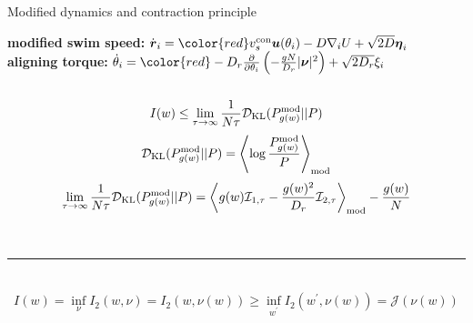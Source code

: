 \documentclass{beamer}
\begin{document}
\begin{frame}{Modified dynamics and contraction principle}

{\bf modified swim speed:} $\dot{\boldsymbol{r}}_i = {\color{red}v^{\rm con}_s} \boldsymbol{u}(\theta_i) - D \nabla_i U + \sqrt{2 D} \boldsymbol{\eta}_i$\\
{\bf aligning torque:} $\dot{\theta}_i = {\color{red}-D_r \frac{\partial}{\partial \theta_i} \left(- \frac{g N}{D_r} |\boldsymbol{\nu}|^2\right)} + \sqrt{2 D_r} \xi_i$\\
\mbox{}\\

\begin{align*}
I(w) \leq \lim_{\tau \to \infty} \frac{1}{N \tau} \mathcal{D}_{\rm KL}(P^{\rm mod}_{g(w)} || P)
\end{align*}
\begin{align*}
\mathcal{D}_{\rm KL}(P^{\rm mod}_{g(w)} || P) = \left<\log\frac{P^{\rm mod}_{g(w)}}{P}\right>_{\rm mod}
\end{align*}
\begin{align*}
\lim_{\tau \to \infty} \frac{1}{N \tau} \mathcal{D}_{\rm KL}(P^{\rm mod}_{g(w)} || P) = \left<g(w) \mathcal{I}_{1, \tau} - \frac{g(w)^2}{D_r} \mathcal{I}_{2, \tau}\right>_{\rm mod} - \frac{g(w)}{N}
\end{align*}

\mbox{}\\
\hrule
\mbox{}\\

\begin{align*}
I(w) = \inf_{\nu} I_2(w, \nu) = I_2(w, \nu(w)) \geq \inf_{w^{\prime}} I_2(w^{\prime}, \nu(w))= \mathcal{J}(\nu(w))
\end{align*}


\end{frame}
\end{document}

